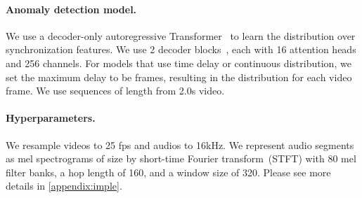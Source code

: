 \documentclass[10pt,twocolumn,letterpaper]{article}
\newcommand{\mypar}[1]{\vspace{-3mm}\paragraph{#1}}
\newcommand{\supparxiv}[2]{#2}
\begin{document}
\mypar{Anomaly detection model.} 
We use a decoder-only autoregressive Transformer~\cite{liu2018generating,esser2021taming,radford2019language} to learn the distribution over synchronization features. We use 2 decoder blocks~\cite{vaswani2017attention}, each with 16 attention heads and 256 channels. 
For models that use time delay or continuous distribution, we set the maximum delay to be  frames, resulting in the distribution  for each video frame. We use sequences of length  from 2.0s video.







\mypar{Hyperparameters.} 
We resample videos to 25 fps and audios to 16kHz. We represent audio segments as mel spectrograms of size  by short-time Fourier transform~(STFT) with 80 mel filter banks, a hop length of 160, and a window size of 320. Please see more details in \supparxiv{the supp}{\cref{appendix:imple}}.
\end{document}

